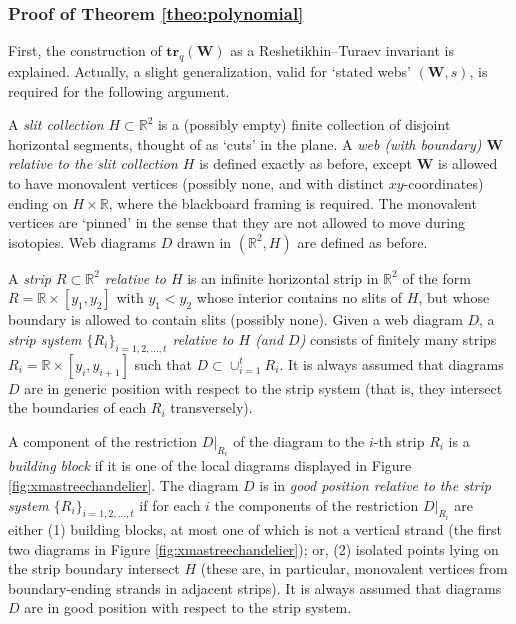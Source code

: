 \documentclass[12pt, reqno]{amsart}
\theoremstyle{definition}
\newcommand{\R}{\mathbb{R}}%
\newcommand{\trq}{\mathbf{tr}_q}%
\begin{document}
\subsubsection{Proof of Theorem \ref{theo:polynomial}}\label{sssec:proofofLaurentproperty}

First, the construction of $\trq(\mathbf{W})$ as a Reshetikhin--Turaev invariant is explained.  Actually, a slight generalization, valid for `stated webs' $(\mathbf{W},s)$, is required for the following argument.

A \emph{slit collection} $H\subset\R^2$ is a (possibly empty) finite collection of disjoint horizontal segments, thought of as `cuts' in the plane.  A \emph{web (with boundary) $\mathbf{W}$ relative to the slit collection $H$} is defined exactly as before, except $\mathbf{W}$ is allowed to have monovalent vertices (possibly none, and with distinct $xy$-coordinates) ending on $H\times\R$, where the blackboard framing is required.  The monovalent vertices are `pinned' in the sense that they are not allowed to move during isotopies.  Web diagrams $D$ drawn in $(\R^2,H)$ are defined as before.  

A \emph{strip $R\subset\R^2$ relative to $H$} is an infinite horizontal strip in $\R^2$ of the form $R=\R\times[y_1,y_2]$ with $y_1<y_2$ whose interior contains no slits of $H$, but whose boundary is allowed to contain slits (possibly none).  Given a web diagram $D$, a \emph{strip system $\{R_i\}_{i=1,2,\dots,t}$ relative to $H$ (and $D$)} consists of finitely many strips $R_i=\R\times[y_i,y_{i+1}]$ such that $D\subset\cup_{i=1}^t R_i$.  It is always assumed that diagrams $D$ are in generic position with respect to the strip system (that is, they intersect the boundaries of each $R_i$ transversely).

A component of the restriction $D|_{R_i}$ of the diagram to the $i$-th strip $R_i$ is a \emph{building block} if it is one of the local diagrams displayed in Figure \ref{fig:xmastreechandelier}.  The diagram $D$ is in \emph{good position relative to the strip system $\{R_i\}_{i=1,2,\dots,t}$} if for each $i$ the components of the restriction $D|_{R_i}$ are either (1) building blocks, at most one of which is not a vertical strand (the first two diagrams in Figure \ref{fig:xmastreechandelier}); or, (2) isolated points lying on the strip boundary intersect $H$ (these are, in particular, monovalent vertices from boundary-ending strands in adjacent strips).  It is always assumed that diagrams $D$ are in good position with respect to the strip system.  
\end{document}
